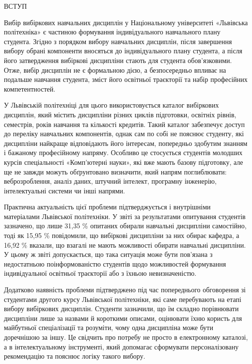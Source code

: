 \documentclass[
]{article}
\begin{document}
\protect{}\label{_Toc230434076}{}ВСТУП

Вибір вибіркових навчальних дисциплін у Національному університеті
«Львівська політехніка» є частиною формування індивідуального
навчального плану студента. Згідно з порядком вибору навчальних
дисциплін, після завершення вибору обрані компоненти вносяться до
індивідуального плану студента, а після його затвердження вибіркові
дисципліни стають для студента обов'язковими. Отже, вибір дисциплін не є
формальною дією, а безпосередньо впливає на подальше навчання студента,
зміст його освітньої траєкторії та набір професійних компетентностей.

У Львівській політехніці для цього використовується каталог вибіркових
дисциплін, який містить дисципліни різних циклів підготовки, освітніх
рівнів, семестрів, років навчання та кількості кредитів. Такий каталог
забезпечує доступ до переліку навчальних компонентів, однак сам по собі
не пояснює студенту, які дисципліни найкраще відповідають його
інтересам, попередньо здобутим знанням і бажаному професійному напряму.
Особливо це стосується студентів молодших курсів спеціальності
«Комп'ютерні науки», які вже мають базову підготовку, але ще не завжди
можуть обґрунтовано визначити, який напрям поглиблювати: веброзроблення,
аналіз даних, штучний інтелект, програмну інженерію, інтелектуальні
системи чи інші напрями.

Практична актуальність цієї проблеми підтверджується і внутрішніми
матеріалами Львівської політехніки. У звіті за результатами опитування
студентів зазначено, що лише 31,35 \% опитаних обирали навчальні
дисципліни самостійно, тоді як 15,95 \% повідомили, що вибіркові
дисципліни за них обирає кафедра, а 16,92 \% вказали, що взагалі не
мають можливості обирати навчальні дисципліни. У цьому ж звіті
допускається, що така ситуація може бути пов'язана з недостатньою
поінформованістю студентів щодо можливостей формування індивідуальної
освітньої траєкторії або з їхньою невизначеністю.

Додатково наявність проблеми підтверджено під час попереднього
обговорення зі студентами другого курсу Львівської політехніки, які саме
перебувають на етапі вибору вибіркових дисциплін. Студенти зазначили, що
їм складно порівнювати дисципліни лише за назвами й короткими описами,
оцінювати їхню користь для майбутньої спеціалізації та розуміти, чому
одна дисципліна може бути доречнішою за іншу. Це свідчить про потребу не
просто в електронному каталозі, а в інтелектуальному інструменті, який
допомагає сформувати персоналізовану рекомендацію та пояснює логіку
такого вибору.
\end{document}
